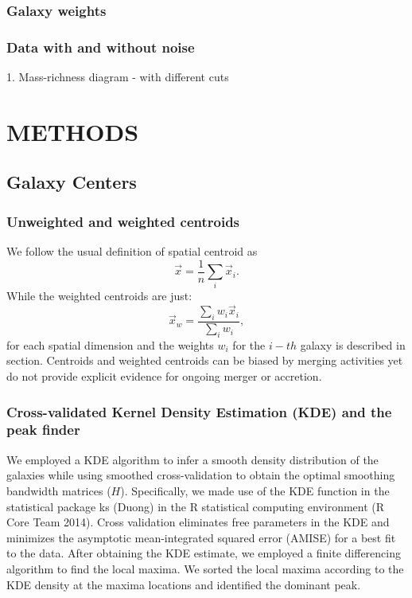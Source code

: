 \documentclass[letterpaper,useAMS,usenatbib]{mn2e}
\begin{document}
\subsubsection{Galaxy weights}
\subsubsection{Data with and without noise}
1. Mass-richness diagram - with different cuts  
\section{METHODS} 
\subsection{Galaxy Centers}
\subsubsection{Unweighted and weighted centroids}
We follow the usual definition of spatial centroid as 
\begin{equation}
	\vec{x} = \frac{1}{n} \sum_i \vec{x}_i. 
\end{equation}
While the weighted centroids are just: 
\begin{equation}
	\vec{x}_w = \frac{\sum_i w_i \vec{x}_i}{\sum_i w_i},
\end{equation}
for each spatial dimension and the weights $w_i$ for the $i-th$ galaxy
is described in section.
Centroids and weighted centroids can be biased by merging activities yet do
not provide explicit evidence for ongoing merger or accretion. 



\subsubsection{Cross-validated Kernel Density Estimation (KDE) and the peak finder} 
We employed a KDE algorithm to infer a smooth density distribution of the
galaxies while using smoothed cross-validation to obtain the optimal smoothing
bandwidth matrices ($H$). Specifically, we made use of the KDE function in
the statistical package ks (Duong) in the R statistical computing environment (R Core Team 2014).
Cross validation eliminates free parameters in the KDE and minimizes
the asymptotic mean-integrated squared error (AMISE) for a best fit to the
data.
After obtaining the KDE estimate, we employed a finite differencing algorithm
to find the local maxima. We sorted the local maxima according to the KDE
density at the maxima locations and identified the dominant peak. 
\end{document}
